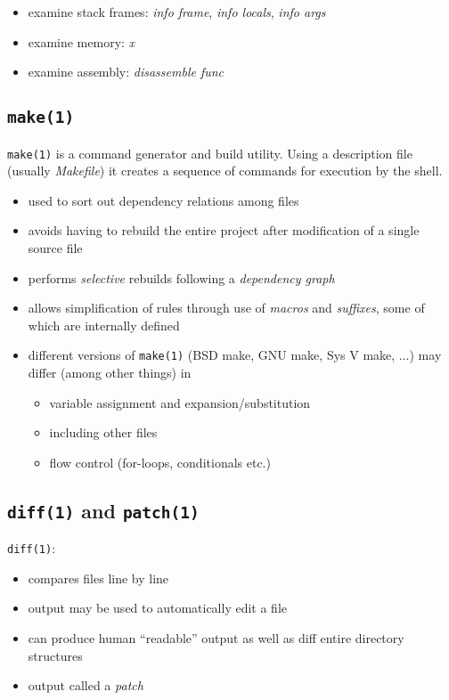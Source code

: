 \documentclass[xga]{xdvislides}
\begin{document}
\begin{itemize}
	\item examine stack frames: {\em info frame}, {\em info locals}, {\em info
		args}
	\item examine memory: {\em x}
	\item examine assembly: {\em disassemble func}
\end{itemize}

\subsection{{\tt make(1)}}
{\tt make(1)} is a command generator and build utility. Using a
description file (usually {\em Makefile}) it creates a sequence of
commands for execution by the shell.

\begin{itemize}
	\item used to sort out dependency relations among files
	\item avoids having to rebuild the entire project after modification of a
		single source file
	\item performs {\em selective} rebuilds following a {\em dependency graph}
	\item allows simplification of rules through use of {\em macros} and {\em
		suffixes}, some of which are internally defined
	\item different versions of {\tt make(1)} (BSD make, GNU make, Sys V make,
		...) may differ (among other things) in
		\begin{itemize}
			\item variable assignment and expansion/substitution
			\item including other files
			\item flow control (for-loops, conditionals etc.)
		\end{itemize}
\end{itemize}

\subsection{{\tt diff(1)} and {\tt patch(1)}}
{\tt diff(1)}:
\begin{itemize}
	\item compares files line by line
	\item output may be used to automatically edit a file
	\item can produce human ``readable'' output as well as diff entire
		directory structures
	\item output called a {\em patch}
\end{itemize}
\end{document}
